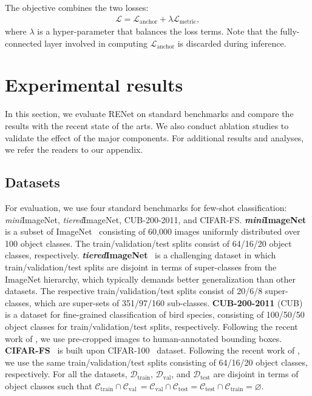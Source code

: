 \documentclass[10pt,twocolumn,letterpaper]{article}
\newcommand{\itmini}{\textit{mini}}
\newcommand{\ittiered}{\textit{tiered}}
\newcommand{\ours}{RENet\xspace}
\begin{document}
The objective combines the two losses: 
\begin{eqnarray}
    \mathcal{L} = \mathcal{L}_{\text{anchor}} + \lambda \mathcal{L}_{\text{metric}},\label{eq:losses}
\end{eqnarray}
where $\lambda$ is a hyper-parameter that balances the loss terms.
Note that the fully-connected layer involved in computing $\mathcal{L}_{\text{anchor}}$ is discarded during inference. \section{Experimental results}
In this section, we evaluate \ours on standard benchmarks and compare the results with the recent state of the arts.
We also conduct ablation studies to validate the effect of the major components.
For additional results and analyses, we refer the readers to our appendix.








\subsection{Datasets}
For evaluation, we use four standard benchmarks for few-shot classification: \itmini ImageNet, \ittiered ImageNet, CUB-200-2011, and CIFAR-FS.
\textbf{\itmini ImageNet}~\cite{matchingnet} is a subset of ImageNet~\cite{russakovsky2015imagenet} consisting of 60,000 images uniformly distributed over 100 object classes.
The train/validation/test splits consist of 64/16/20 object classes, respectively.
\textbf{\ittiered ImageNet}~\cite{tieredimagenet} is a challenging dataset in which train/validation/test splits are disjoint in terms of super-classes from the ImageNet hierarchy, which typically demands better generalization than other datasets.
The respective train/validation/test splits consist of 20/6/8 super-classes, which are super-sets of 351/97/160 sub-classes.
\textbf{CUB-200-2011} (CUB)~\cite{cub} is a dataset for fine-grained classification of bird species, consisting of 100/50/50 object classes for train/validation/test splits, respectively.
Following the recent work of \cite{deepemd, feat}, we use pre-cropped images to human-annotated bounding boxes.
\textbf{CIFAR-FS}~\cite{cifarfs} is built upon CIFAR-100~\cite{cifar} dataset. 
Following the recent work of \cite{cifarfs}, we use the same train/validation/test splits consisting of 64/16/20 object classes, respectively.
For all the datasets, $\mathcal{D}_{\text{train}}$, $\mathcal{D}_{\text{val}}$, and $\mathcal{D}_{\text{test}}$ are disjoint in terms of object classes such that $\mathcal{C}_{\text{train}} \cap \mathcal{C}_{\text{val}} \, = \mathcal{C}_{\text{val}} \cap \mathcal{C}_{\text{test}} = \mathcal{C}_{\text{test}} \cap \mathcal{C}_{\text{train}} = \varnothing$.
\end{document}
